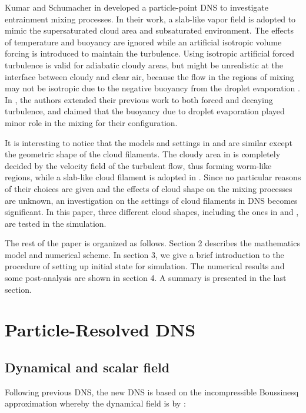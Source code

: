 \documentclass[draft,jgrga]{AGUTeX}
\begin{document}
\begin{article}
Kumar and Schumacher in \cite{Kumar11,Kumar12} developed a particle-point DNS to investigate entrainment mixing processes. In their work, a slab-like vapor field is adopted to mimic the supersaturated cloud area and subsaturated environment. The effects of temperature and buoyancy are ignored while an artificial isotropic volume forcing is introduced to maintain the turbulence. Using isotropic artificial forced turbulence is valid for adiabatic cloudy areas, but might be unrealistic at the interface between cloudy and clear air, because the flow in the regions of mixing may not be isotropic due to the negative buoyancy from the droplet evaporation \cite{Vaillancourt00}. In \cite{Kumar14}, the authors extended their previous work to both forced and decaying turbulence, and claimed that the buoyancy due to droplet evaporation played minor role in the mixing for their configuration.

It is interesting to notice that the models and settings in \cite{Kumar11} and \cite{And04} are similar except the geometric shape of the cloud filaments. The cloudy area in \cite{And04} is completely decided by the velocity field of the turbulent flow, thus forming worm-like regions, while a slab-like cloud filament is adopted in \cite{Kumar11}. Since no particular reasons of their choices are given and the effects of cloud shape on the mixing processes are unknown, an investigation on the settings of cloud filaments in DNS becomes significant. In this paper, three different cloud shapes, including the ones in \cite{Kumar11} and \cite{And04}, are tested in the simulation.

The rest of the paper is organized as follows. Section 2 describes
the mathematics model and numerical scheme. In section 3, we give
a brief introduction to the procedure of setting up initial state for simulation. The numerical results and some post-analysis are shown
in section 4. A summary is presented in the last section. 
\section{Particle-Resolved DNS}


\subsection{Dynamical and scalar field}

Following previous DNS, the new DNS is based on the incompressible
Boussinesq approximation whereby the dynamical field is by \cite{And04}:


\end{article}
\end{document}
